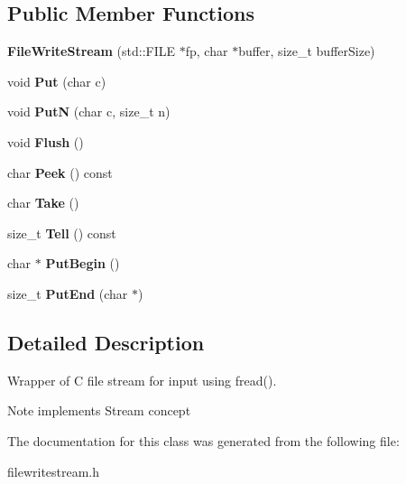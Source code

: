 \subsection*{Public Member Functions}
\begin{DoxyCompactItemize}
\item 
{\bfseries File\+Write\+Stream} (std\+::\+F\+I\+LE $\ast$fp, char $\ast$buffer, size\+\_\+t buffer\+Size)\hypertarget{a00103_a553ea3e7377a7f7cace2daa3cc90e1a1}{}\label{a00103_a553ea3e7377a7f7cace2daa3cc90e1a1}

\item 
void {\bfseries Put} (char c)\hypertarget{a00103_af6a6061d0accd939fa475b9b34427d85}{}\label{a00103_af6a6061d0accd939fa475b9b34427d85}

\item 
void {\bfseries PutN} (char c, size\+\_\+t n)\hypertarget{a00103_ad9ec108b24316a2c1c83c6ddc75d308a}{}\label{a00103_ad9ec108b24316a2c1c83c6ddc75d308a}

\item 
void {\bfseries Flush} ()\hypertarget{a00103_a939fbf183ba36464c5e0837df4329d37}{}\label{a00103_a939fbf183ba36464c5e0837df4329d37}

\item 
char {\bfseries Peek} () const \hypertarget{a00103_a83a8321c33738544f05330f3638e51c0}{}\label{a00103_a83a8321c33738544f05330f3638e51c0}

\item 
char {\bfseries Take} ()\hypertarget{a00103_ac927a0ae09a85eaba58a74ceb04b40ed}{}\label{a00103_ac927a0ae09a85eaba58a74ceb04b40ed}

\item 
size\+\_\+t {\bfseries Tell} () const \hypertarget{a00103_a72889b68dbd766cea0e003389b990722}{}\label{a00103_a72889b68dbd766cea0e003389b990722}

\item 
char $\ast$ {\bfseries Put\+Begin} ()\hypertarget{a00103_a4d1340a64fde3f16ac2afce19537c75e}{}\label{a00103_a4d1340a64fde3f16ac2afce19537c75e}

\item 
size\+\_\+t {\bfseries Put\+End} (char $\ast$)\hypertarget{a00103_a54b14047e4c998db0594290605f8f0dc}{}\label{a00103_a54b14047e4c998db0594290605f8f0dc}

\end{DoxyCompactItemize}


\subsection{Detailed Description}
Wrapper of C file stream for input using fread(). 

\begin{DoxyNote}{Note}
implements Stream concept 
\end{DoxyNote}


The documentation for this class was generated from the following file\+:\begin{DoxyCompactItemize}
\item 
filewritestream.\+h\end{DoxyCompactItemize}
